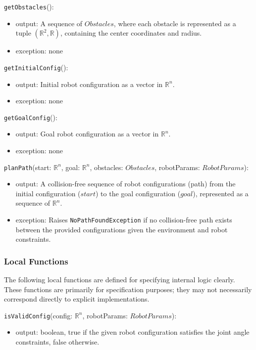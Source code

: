 \documentclass[12pt, titlepage]{article}
\begin{document}
  \noindent \texttt{getObstacles}():
  \begin{itemize}
  \item output: A sequence of \( Obstacles \), where each obstacle is represented as a tuple \((\mathbb{R}^2, \mathbb{R})\), containing the center coordinates and radius.
  \item exception: none
  \end{itemize}
  
  \noindent \texttt{getInitialConfig}():
  \begin{itemize}
  \item output: Initial robot configuration as a vector in \( \mathbb{R}^n \).
  \item exception: none
  \end{itemize}
  
  \noindent \texttt{getGoalConfig}():
  \begin{itemize}
  \item output: Goal robot configuration as a vector in \( \mathbb{R}^n \).
  \item exception: none
  \end{itemize}
  
  \noindent \texttt{planPath}(start: \( \mathbb{R}^n \), goal: \( \mathbb{R}^n \), obstacles: \( Obstacles \), robotParams: \( RobotParams \)):
  \begin{itemize}
  \item output: A collision-free sequence of robot configurations (path) from the initial configuration (\(start\)) to the goal configuration (\(goal\)), represented as a sequence of \( \mathbb{R}^n \).
  \item exception: Raises \texttt{NoPathFoundException} if no collision-free path exists between the provided configurations given the environment and robot constraints.
  \end{itemize}
  

  \subsubsection{Local Functions}

  The following local functions are defined for specifying internal logic clearly. These functions are primarily for specification purposes; they may not necessarily correspond directly to explicit implementations.
  
  \noindent \texttt{isValidConfig}(config: $\mathbb{R}^n$, robotParams: $RobotParams$):
  \begin{itemize}
    \item output: boolean, true if the given robot configuration satisfies the joint angle constraints, false otherwise.
  \end{itemize}
  
\end{document}
